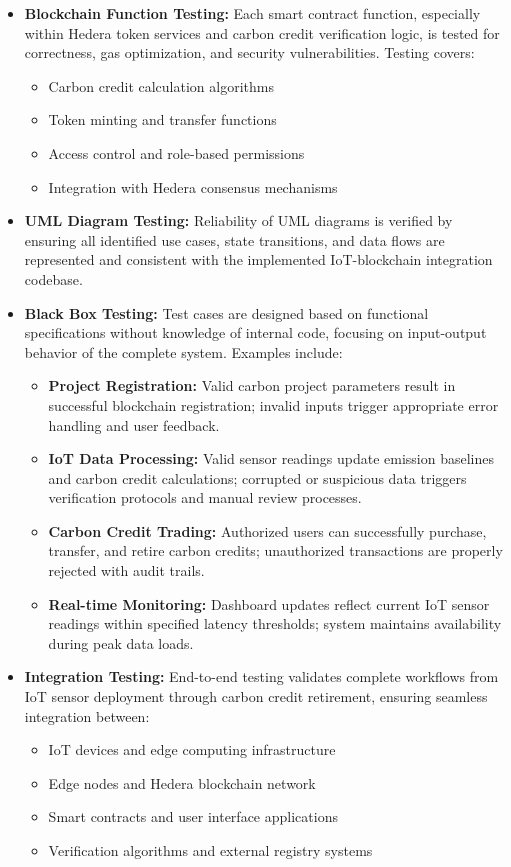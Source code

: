 \documentclass[oneside,a4paper,12pt]{book}
\begin{document}
\begin{appendices}
\begin{itemize}[leftmargin=*]
\item \textbf{Blockchain Function Testing:} Each smart contract function, especially within Hedera token services and carbon credit verification logic, is tested for correctness, gas optimization, and security vulnerabilities. Testing covers:
\begin{itemize}
\item Carbon credit calculation algorithms
\item Token minting and transfer functions
\item Access control and role-based permissions
\item Integration with Hedera consensus mechanisms
\end{itemize}

\item \textbf{UML Diagram Testing:} Reliability of UML diagrams is verified by ensuring all identified use cases, state transitions, and data flows are represented and consistent with the implemented IoT-blockchain integration codebase.

\item \textbf{Black Box Testing:} Test cases are designed based on functional specifications without knowledge of internal code, focusing on input-output behavior of the complete system. Examples include:
\begin{itemize}
\item \textbf{Project Registration:} Valid carbon project parameters result in successful blockchain registration; invalid inputs trigger appropriate error handling and user feedback.
\item \textbf{IoT Data Processing:} Valid sensor readings update emission baselines and carbon credit calculations; corrupted or suspicious data triggers verification protocols and manual review processes.
\item \textbf{Carbon Credit Trading:} Authorized users can successfully purchase, transfer, and retire carbon credits; unauthorized transactions are properly rejected with audit trails.
\item \textbf{Real-time Monitoring:} Dashboard updates reflect current IoT sensor readings within specified latency thresholds; system maintains availability during peak data loads.
\end{itemize}

\item \textbf{Integration Testing:} End-to-end testing validates complete workflows from IoT sensor deployment through carbon credit retirement, ensuring seamless integration between:
\begin{itemize}
\item IoT devices and edge computing infrastructure
\item Edge nodes and Hedera blockchain network
\item Smart contracts and user interface applications
\item Verification algorithms and external registry systems
\end{itemize}


\end{itemize}
\end{appendices}
\end{document}
